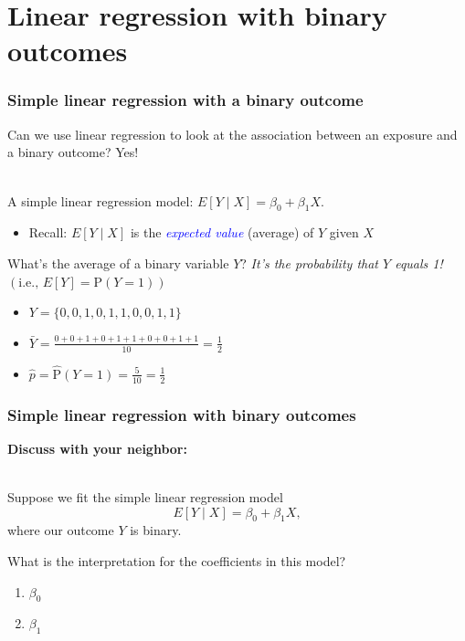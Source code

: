 \documentclass[10pt,t]{beamer}
\begin{document}
\section{Linear regression with binary outcomes}
%	
\begin{frame}
	\frametitle{Simple linear regression with a binary outcome}
	Can we use linear regression to look at the association between an exposure and a binary outcome? Yes!
	\\ ~\
	
	A simple linear regression model: $E[Y \mid X] = \beta_0 + \beta_1 X$.
	\begin{footnotesize}
		\begin{itemize}
			\item Recall: $E[Y \mid X]$ is the \textcolor{blue}{\textit{expected value}} (average) of $Y$ given $X$ 
		\end{itemize}
	\end{footnotesize}
	\pause
	What's the average of a binary variable $Y$? \pause \textit{It's the probability that $Y$ equals 1!} $\left(\text{i.e., } E[Y] = \text{P}(Y=1)\right)$ \pause
	
	\begin{itemize} \itemsep +12pt
		\item[] $Y = \{ 0, 0, 1, 0, 1, 1, 0, 0, 1, 1 \}$ \pause
		\item[] $\bar{Y} = \frac{0 + 0 + 1 + 0 + 1 + 1 + 0 + 0 + 1 + 1}{10} = \frac{1}{2}$ \pause
		\item[] $\hat{p} = \hat{\text{P}}(Y=1) = \frac{5}{10} = \frac{1}{2} $
	\end{itemize}
\end{frame}

\begin{frame}
	\frametitle{Simple linear regression with binary outcomes}
	\textbf{Discuss with your neighbor:} 
	\\ ~\ 
	
	Suppose we fit the simple linear regression model $$E[Y \mid X] = \beta_0 + \beta_1 X,$$ where our outcome $Y$ is binary.
	
	What is the interpretation for the coefficients in this model?
	
	\begin{enumerate}
			\item $\beta_0$
			\item $\beta_1$
		\end{enumerate} 
\end{frame}
\end{document}
